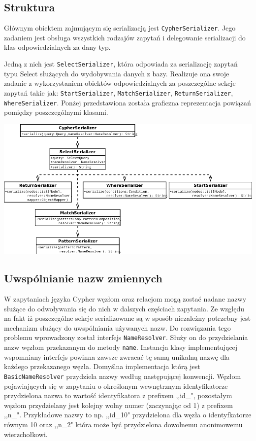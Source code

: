 \documentclass[brudnopis]{xmgr}
\begin{document}
\subsection{Struktura}

Głównym obiektem zajmującym się serializacją jest \texttt{CypherSerializer}. Jego zadaniem jest obsługa wszystkich rodzajów zapytań i delegowanie serializacji do klas odpowiedzialnych za dany typ.

Jedną z nich jest \texttt{SelectSerializer}, która odpowiada za serializację zapytań typu Select służących do wydobywania danych z bazy. Realizuje ona swoje zadanie z wykorzystaniem obiektów odpowiedzialnych za poszczególne sekcje zapytań takie jak: \texttt{StartSerializer}, \texttt{MatchSerializer}, \texttt{ReturnSerializer}, \texttt{WhereSerializer}. Ponżej przedstawiona została graficzna reprezentacja powiązań pomiędzy poszczególnymi klasami.

\includegraphics[scale=0.5]{images/cypher-serialization-uml.png}

\subsection{Uwspólnianie nazw zmiennych}

W zapytaniach języka Cypher węzłom oraz relacjom mogą zostać nadane nazwy służące do odwoływania się do nich w dalszych częściach zapytania. Ze względu na fakt iż poszczególne sekcje serializowane są w sposób niezależny potrzebny jest mechanizm służący do uwspólniania używanych nazw. Do rozwiązania tego problemu wprowadzony został interfejs \texttt{NameResolver}. Służy on do przydzielania nazw węzłom przekazanym do metody \texttt{name}. Instancja klasy implementującej wspomniany interfejs powinna zawsze zwracać tę samą unikalną nazwę dla każdego przekazanego węzła. Domyślna implementacja którą jest \texttt{BasicNameResolver} przydziela nazwy według następującej konwencji. Węzłom pojawiających się w zapytaniu o określonym wewnętrznym identyfikatorze przydzielona nazwa to wartość identyfikatora z prefixem ,,id\_", pozostałym węzłom przydzielany jest kolejny wolny numer (zaczynając od 1) z prefixem ,,n\_". Przykładowe nazwy to np. ,,id\_10" przydzielona dla węzła o identyfkatorze równym 10 oraz ,,n\_2" która może być przydzielona dowolnemu anonimowemu wierzchołkowi.
\end{document}
